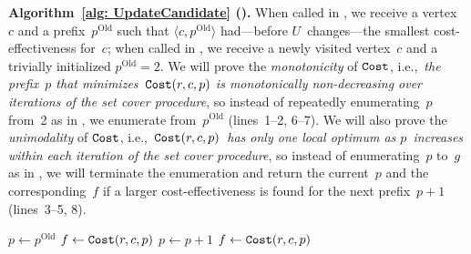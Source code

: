 \textbf{Algorithm~\ref{alg: UpdateCandidate} (\UpdateCandidate).}
When called in \Improved, we receive a vertex~$c$ and a prefix~$p^\text{Old}$ such that $\langle c,p^\text{Old} \rangle$ had---before $U$~changes---the smallest cost-effectiveness for~$c$; when called in \PartialDijkstra, we receive a newly visited vertex~$c$ and a trivially initialized $p^\text{Old}=2$. We will prove the \emph{monotonicity} of $\mathtt{Cost}$, i.e.,~\emph{the prefix~$p$ that minimizes~$\mathtt{Cost}(r,c,p)$ is monotonically non-decreasing over iterations of the set cover procedure}, so instead of repeatedly enumerating~$p$ from~2 as in \Basic, we enumerate from~$p^\text{Old}$ (lines~1--2, 6--7). We will also prove the \emph{unimodality} of $\mathtt{Cost}$, i.e.,~\emph{$\mathtt{Cost}(r,c,p)$~has only one local optimum as $p$~increases within each iteration of the set cover procedure}, so instead of enumerating~$p$ to~$g$ as in \Basic, we will terminate the enumeration and return the current~$p$ and the corresponding~$f$ if a larger cost-effectiveness is found for the next prefix~$p+1$ (lines~3--5, 8).


\begin{algorithm}[t]
    \(p\leftarrow p^\text{Old}\)\;
    $f \leftarrow \mathtt{Cost}(r,c,p)$\; 
    {
        {
            \Break\;
        }
        \(p\leftarrow p+1\)\;
        \(f\leftarrow \mathtt{Cost}(r,c,p)\)\;
    }
    \;
\caption{\UpdateCandidate}
\label{alg: UpdateCandidate}
\end{algorithm}

